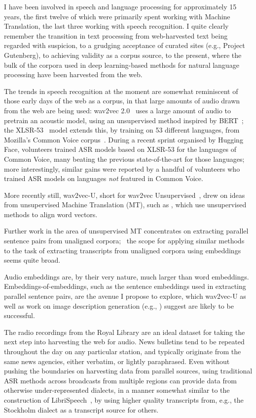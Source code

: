 \documentclass{article}[11pt]
\begin{document}
I have been involved in speech and language processing for approximately 15 years, the first twelve of which were primarily spent working with Machine Translation, the last three working with speech recognition. I quite clearly remember the transition in text processing from web-harvested text being regarded with suspicion, to a grudging acceptance of curated sites (e.g., Project Gutenberg), to achieving validity as a corpus source, to the present, where the bulk of the corpora used in deep learning-based methods for natural language processing have been harvested from the web.

The trends in speech recognition at the moment are somewhat reminiscent of those early days of the web as a corpus, in that large amounts of audio drawn from the web are being used: wav2vec 2.0~\citep{baevski2020wav2vec} uses a large amount of audio to pretrain an acoustic model, using an unsupervised method inspired by BERT~\citep{devlin2019bert}; the XLSR-53~\citep{conneau2020unsupervised} model extends this, by training on 53 different languages, from Mozilla's Common Voice corpus~\citep{ardila-etal-2020-common}. During a recent sprint organised by Hugging Face, volunteers trained ASR models based on XLSR-53 for the languages of Common Voice, many beating the previous state-of-the-art for those languages; more interestingly, similar gains were reported by a handful of volunteers who trained ASR models on languages \textit{not} featured in Common Voice.

More recently still, wav2vec-U, short for wav2vec Unsupervised~\citep{baevski2021unsupervised}, drew on ideas from unsupervised Machine Translation (MT), such as \citet{artetxe-etal-2018-robust}, which use unsupervised methods to align word vectors.

Further work in the area of unsupervised MT concentrates on extracting parallel sentence pairs from unaligned corpora;~\citep{artetxe2019marginbased,artetxe2019massively} the scope for applying similar methods to the task of extracting transcripts from unaligned corpora using embeddings seems quite broad.

Audio embeddings are, by their very nature, much larger than word embeddings. Embeddings-of-embeddings, such as the sentence embeddings used in extracting parallel sentence pairs, are the avenue I propose to explore, which wav2vec-U as well as work on image description generation (e.g., \citet{karpathy2015deep}) suggest are likely to be successful.

The radio recordings from the Royal Library are an ideal dataset for taking the next step into harvesting the web for audio. News bulletins tend to be repeated throughout the day on any particular station, and typically originate from the same news agencies, either verbatim, or lightly paraphrased. Even without pushing the boundaries on harvesting data from parallel sources, using traditional ASR methods across broadcasts from multiple regions can provide data from otherwise under-represented dialects, in a manner somewhat similar to the construction of LibriSpeech~\citep{panayotov2015}, by using higher quality transcripts from, e.g., the Stockholm dialect as a transcript source for others.
\end{document}
